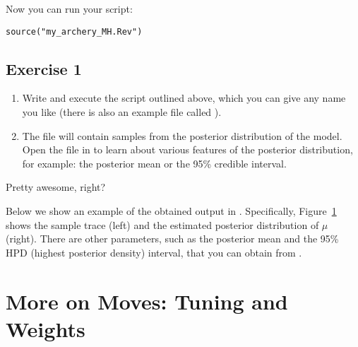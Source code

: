 Now you can run your \RevBayes script:
{\tt \begin{snugshade*}
\begin{lstlisting}
source("my_archery_MH.Rev")
\end{lstlisting}
\end{snugshade*}}

\subsection{Exercise 1}

\begin{enumerate}[label=\textnormal{Step \arabic*)},leftmargin=1.5cm]
	\item Write and execute the script outlined above, which you can give any name you like (there is also an example file called ).
	\item The  file will contain samples from the posterior distribution of the model. Open the file in \Tracer to learn about various features of the posterior distribution, for example: the posterior mean or the 95\% credible interval.
\end{enumerate}
Pretty awesome, right?

Below we show an example of the obtained output in \Tracer.
Specifically, Figure~\ref{fig:mcmc_samples} shows the sample trace (left) and the estimated posterior distribution of $\mu$ (right).
There are other parameters, such as the posterior mean and the 95\% HPD (highest posterior density) interval, that you can obtain from \Tracer.
\begin{figure}[h!]
\centering
{}
\label{fig:mcmc_samples}
\end{figure}
\pagebreak


\section{More on Moves: Tuning and Weights}\label{sect:More_on_Moves}

